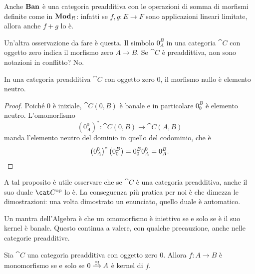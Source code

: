 \begin{example}
  Anche \(\mathbf{Ban}\) è una categoria preadditiva con le operazioni di somma
  di morfismi definite come in \(\mathbf{Mod}_R\): infatti se \(f, g
  : E \to F\) sono applicazioni lineari limitate, allora anche \(f + g\)
  lo è.
\end{example}

Un'altra osservazione da fare è questa. Il simbolo \(0_A^B\) in una
categoria \(\cat C\) con oggetto zero indica il morfismo zero
\(A \to B\). Se \(\cat C\) è preaddittiva, non sono notazioni in
conflitto?  No.

\begin{proposition}
  In una categoria preadditiva \(\cat C\) con oggetto zero \(0\), il
  morfismo nullo è elemento neutro.
\end{proposition}

\begin{proof}
  Poiché \(0\) è iniziale, \(\cat C(0, B)\) è banale e in particolare
  \(0_0^B\) è elemento neutro. L'omomorfismo
  \[
    \left(0_A^0\right)^\ast : \cat C(0, B) \to \cat C(A, B)
  \]
  manda l'elemento neutro del dominio in quello del codominio, che è
  \[
    \left(0_A^0\right)^\ast\left(0_0^B\right) = 0_0^B 0_A^0 = 0_A^B
    . \qedhere
  \]
\end{proof}

\begin{remark}
  A tal proposito è utile osservare che se \(\cat C\) è una categoria
  preadditiva, anche il suo duale \(\opcat C\) lo è. La conseguenza più
  pratica per noi è che dimezza le dimostrazioni: una volta dimostrato
  un enunciato, quello duale è automatico.
\end{remark}

Un mantra dell'Algebra è che un omomorfismo è iniettivo se e solo se è
il suo kernel è banale. Questo continua a valere, con qualche
precauzione, anche nelle categorie preadditive.

\begin{proposition}\label{proposition:MonoIffKerIsTrivial}
  Sia \(\cat C\) una categoria preadditiva con oggetto zero
  \(0\). Allora \(f : A \to B\) è monomorfismo se e solo se
  \(\begin{tikzcd}[column sep=small, cramped] 0 \ar["{\exists!}", r] &
    A \end{tikzcd}\) è kernel di \(f\).
\end{proposition}


